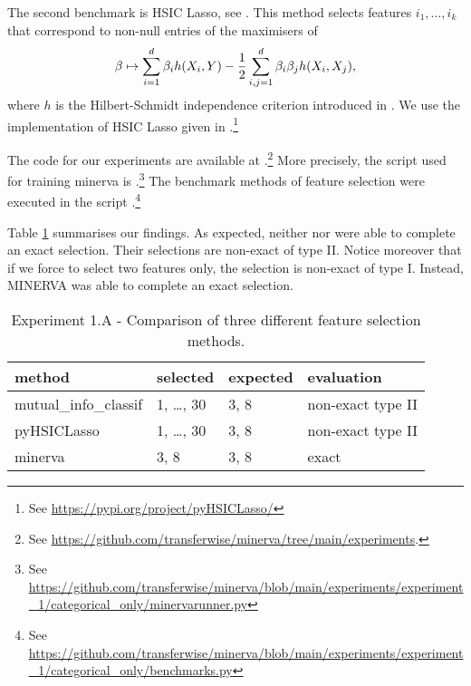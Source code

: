 The second benchmark is
HSIC Lasso,
see 
\cite{YJSXS14hig}.
This method 
selects features $i_1, \dots, i_k$
that correspond to non-null entries of the 
maximisers of 
\begin{equation*}
	\beta \mapsto 
	\sum_{i=1}^{d} \beta_i h(X_i, Y)
	-\frac{1}{2}
	\sum_{i,j = 1}^{d} \beta_i \beta_j h(X_i, X_j),
\end{equation*}
where $h$ is the Hilbert-Schmidt independence criterion 
introduced in 
\cite{GBSS05mea}.
We use the implementation of HSIC Lasso
given in
.\footnote{
See \url{https://pypi.org/project/pyHSICLasso/}
}

The code for our experiments are available 
at
.\footnote{
	See
\url{https://github.com/transferwise/minerva/tree/main/experiments}. 
}
More precisely, 
the script used for training minerva is
.\footnote{
	See
\url{https://github.com/transferwise/minerva/blob/main/experiments/experiment\_1/categorical\_only/minervarunner.py}
}
The benchmark methods of feature selection 
were
executed
in the script
.\footnote{
	See
\url{https://github.com/transferwise/minerva/blob/main/experiments/experiment\_1/categorical\_only/benchmarks.py}
}


Table
\ref{tab.experiment1A}
summarises our findings. 
As expected, 
neither 
nor
were able to complete an exact selection. 
Their selections are non-exact of type II. 
Notice moreover that if we force 
to select two features only,
the selection is non-exact of type I.
Instead,
MINERVA
was able to complete an exact selection.

\begin{table}
	\centering
{
	\begin{tabular}{l|l|l|l}
		\textbf{method}
		&
		\textbf{selected}
		&
		\textbf{expected}
		&
		\textbf{evaluation}
		\\
		\hline
		mutual\_info\_classif
		&
		1, \dots, 30
		& 
		3, 8
		&
		non-exact type II
		\\
		pyHSICLasso
		&
		1, \dots, 30
		& 
		3, 8
		&
		non-exact type II
		\\
		minerva
		& 
		3, 8
		&
		3, 8
		&
		exact
	\end{tabular}
}
\caption{Experiment 1.A - Comparison of three different feature selection methods.}
\label{tab.experiment1A}
\end{table}






